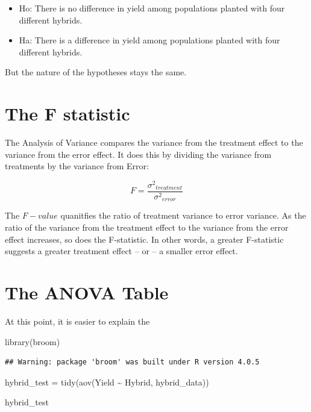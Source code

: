 \documentclass[
]{book}
\newenvironment{Shaded}{\begin{snugshade}}{\end{snugshade}}
\newcommand{\FunctionTok}[1]{\textcolor[rgb]{0.00,0.00,0.00}{#1}}
\newcommand{\NormalTok}[1]{#1}
\newcommand{\OtherTok}[1]{\textcolor[rgb]{0.56,0.35,0.01}{#1}}
\newcommand{\SpecialCharTok}[1]{\textcolor[rgb]{0.00,0.00,0.00}{#1}}
\providecommand{\tightlist}{%
  \setlength{\itemsep}{0pt}\setlength{\parskip}{0pt}}
\begin{document}
\begin{itemize}
\tightlist
\item
  Ho: There is no difference in yield among populations planted with four different hybrids.
\item
  Ha: There is a difference in yield among populations planted with four different hybrids.
\end{itemize}

But the nature of the hypotheses stays the same.

\hypertarget{the-f-statistic}{%
\section{The F statistic}\label{the-f-statistic}}

The Analysis of Variance compares the variance from the treatment effect to the variance from the error effect. It does this by dividing the variance from treatments by the variance from Error:

\[F = \frac{\sigma{^2}_{treatment}}{\sigma{^2}_{error}} \]

The \(F-value\) quanitfies the ratio of treatment variance to error variance. As the ratio of the variance from the treatment effect to the variance from the error effect increases, so does the F-statistic. In other words, a greater F-statistic suggests a greater treatment effect -- or -- a smaller error effect.

\hypertarget{the-anova-table}{%
\section{The ANOVA Table}\label{the-anova-table}}

At this point, it is easier to explain the

\begin{Shaded}
\begin{Highlighting}[]
\FunctionTok{library}\NormalTok{(broom)}
\end{Highlighting}
\end{Shaded}

\begin{verbatim}
## Warning: package 'broom' was built under R version 4.0.5
\end{verbatim}

\begin{Shaded}
\begin{Highlighting}[]
\NormalTok{hybrid\_test }\OtherTok{=} \FunctionTok{tidy}\NormalTok{(}\FunctionTok{aov}\NormalTok{(Yield }\SpecialCharTok{\textasciitilde{}}\NormalTok{ Hybrid, hybrid\_data))}

\NormalTok{hybrid\_test}
\end{Highlighting}
\end{Shaded}
\end{document}
